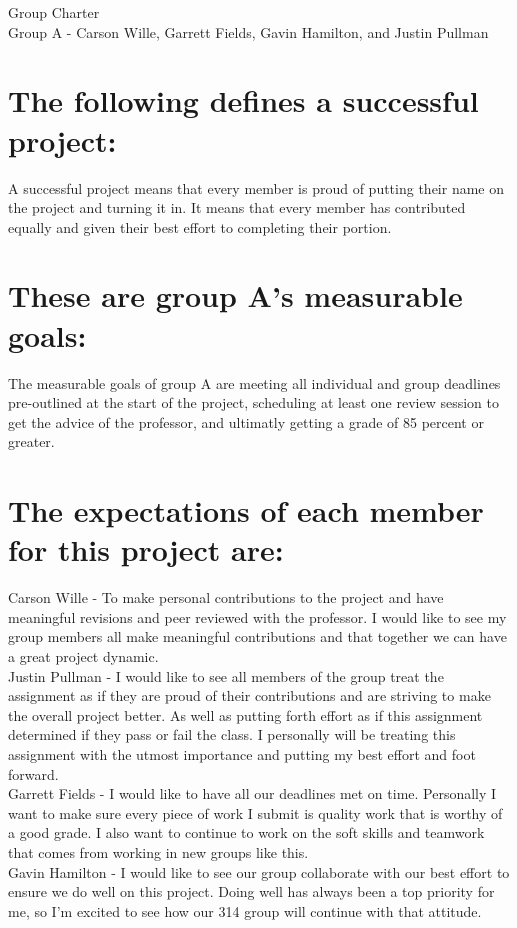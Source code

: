 \documentclass[12pt,A4paper]{article}
\begin{document}
	\begin{center}
		\Large
		Group Charter \\
		\vspace{.25 in}
		\normalsize
		Group A - Carson Wille, Garrett Fields, Gavin Hamilton, and Justin Pullman
	\end{center}
\section{The following defines a successful project:}
	A successful project means that every member is proud of putting their name on the project and turning it in. It means that every member has contributed equally and given their best effort to completing their portion. 
	
\section{These are group A's measurable goals:}
	The measurable goals of group A are meeting all individual and group deadlines pre-outlined at the start of the project, scheduling at least one review session to get the advice of the professor, and ultimatly getting a grade of 85 percent or greater.
	
\section{The expectations of each member for this project are:}
	Carson Wille - To make personal contributions to the project and have meaningful revisions and peer reviewed with the professor. I would like to see my group members all make meaningful contributions and that together we can have a great project dynamic. \\
	Justin Pullman - I would like to see all members of the group treat the assignment as if they are proud of their contributions and are striving to make the overall project better.  As well as putting forth effort as if this assignment determined if they pass or fail the class. I personally will be treating this assignment with the utmost importance and putting my best effort and foot forward. \\
	Garrett Fields - I would like to have all our deadlines met on time. Personally I want to make sure every piece of work I submit is quality work that is worthy of a good grade. I also want to continue to work on the soft skills and teamwork that comes from working in new groups like this. \\
	Gavin Hamilton - I would like to see our group collaborate with our best effort to ensure we do well on this project. Doing well has always been a top priority for me, so I’m excited to see how our 314 group will continue with that attitude. \\
	
\end{document}

